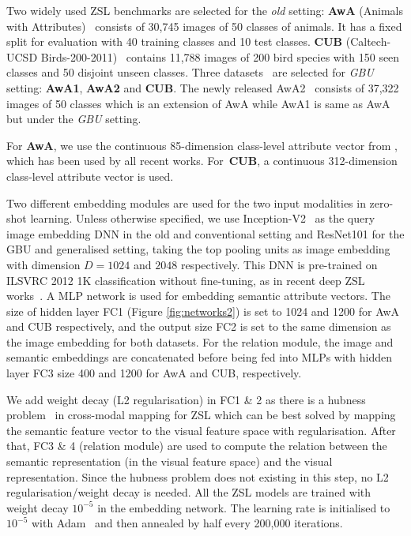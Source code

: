 \documentclass[10pt,twocolumn,letterpaper]{article}
\begin{document}
Two widely used ZSL benchmarks are selected for the \emph{old} setting:
\textbf{AwA} (Animals with Attributes)~\cite{lampert2014attribute} consists of 30,745 images of 50 classes of animals. It has a fixed split for evaluation with 40 training classes and 10 test classes. \textbf{CUB} (Caltech-UCSD Birds-200-2011)~\cite{wah2011multiclass} contains 11,788 images of 200 bird species with 150 seen classes and 50 disjoint unseen classes. 
Three datasets~\cite{xian2017zero} are selected for \emph{GBU} setting: \textbf{AwA1}, \textbf{AwA2} and \textbf{CUB}. The newly released AwA2~\cite{xian2017zero} consists of 37,322 images of 50 classes which is an extension of AwA while AwA1 is same as AwA but under the \emph{GBU} setting.



For \textbf{AwA}, we use the continuous 85-dimension class-level attribute vector from \cite{lampert2014attribute}, which has been used by all recent works. For~\textbf{CUB}, a continuous 312-dimension class-level attribute vector is used.

Two different embedding modules are used for the two input modalities in zero-shot learning. 
Unless otherwise specified, we use Inception-V2~\cite{szegedy2015going, ioffe2015batch} as the query image embedding DNN   in the old and conventional setting and ResNet101 \cite{he2016cvpr} for the GBU and generalised setting, taking the top pooling units as image embedding with dimension $D=1024$ and $2048$ respectively. This DNN is pre-trained on ILSVRC 2012 1K classification without fine-tuning,  as in recent deep ZSL works~\cite{lei2015predicting, reed2016learning, zhang2017learning}. A MLP network is used for embedding semantic attribute vectors. The size of  hidden layer FC1 (Figure \ref{fig:networks2}) is set to 1024 and 1200 for AwA and CUB respectively, and the output size FC2 is set to the same dimension as the image embedding for both datasets. For the relation module, the image and semantic embeddings are concatenated before being fed into MLPs with hidden layer FC3 size 400 and 1200 for AwA and CUB, respectively. 

We add weight decay (L2 regularisation) in FC1 \& 2 as there is a hubness problem~\cite{zhang2017learning} in cross-modal mapping
for ZSL which can be best solved by mapping the semantic feature vector to the visual feature space with regularisation. After that, FC3 \& 4 (relation module) are used to compute the relation between the semantic representation (in the visual feature space) and the visual representation. Since the hubness problem does not existing in this step, no L2 regularisation/weight decay is needed.
All the ZSL models are trained with weight decay $10^{-5}$ in the embedding network. The learning rate is initialised to $10^{-5}$ with Adam~\cite{kingma2014adam} and then annealed by half every 200,000 iterations.
\end{document}
